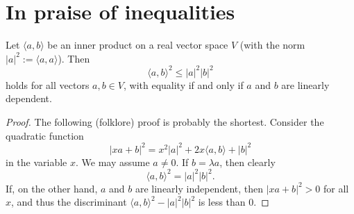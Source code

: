 \chapter{In praise of inequalities}
\label{chapter20}
\begin{theorem}
  \label{ch20theoremI}
  \leanok
Let $\langle a, b \rangle$ be an inner product on a real vector space $V$ (with the norm $|a|^2 := \langle a, a \rangle$). Then
\[
\langle a, b \rangle^2 \leq |a|^2 |b|^2
\]
holds for all vectors $a, b \in V$, with equality if and only if $a$ and $b$ are linearly dependent.
\end{theorem}
\begin{proof}
  \leanok
The following (folklore) proof is probably the shortest. Consider the quadratic function
\[
|x a + b|^2 = x^2 |a|^2 + 2x \langle a, b \rangle + |b|^2
\]
in the variable $x$. We may assume $a \neq 0$. If $b = \lambda a$, then clearly
\[
\langle a, b \rangle^2 = |a|^2 |b|^2.
\]
If, on the other hand, $a$ and $b$ are linearly independent, then $|x a + b|^2 > 0$ for all $x$,
and thus the discriminant $\langle a, b \rangle^2 - |a|^2 |b|^2$ is less than 0.
\end{proof}

